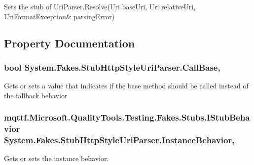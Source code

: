 Sets the stub of Uri\-Parser.\-Resolve(Uri base\-Uri, Uri relative\-Uri, Uri\-Format\-Exception\& parsing\-Error)



\subsection{Property Documentation}
\hypertarget{class_system_1_1_fakes_1_1_stub_http_style_uri_parser_a24a145543e9043e222e7a497476f4274}{
\subsubsection[{Call\-Base}]{\setlength{\rightskip}{0pt plus 5cm}bool System.\-Fakes.\-Stub\-Http\-Style\-Uri\-Parser.\-Call\-Base\hspace{0.3cm}{\ttfamily [get]}, {\ttfamily [set]}}}\label{class_system_1_1_fakes_1_1_stub_http_style_uri_parser_a24a145543e9043e222e7a497476f4274}


Gets or sets a value that indicates if the base method should be called instead of the fallback behavior

\hypertarget{class_system_1_1_fakes_1_1_stub_http_style_uri_parser_aa4947c1336e854be44b501f4b5b7add3}{
\subsubsection[{Instance\-Behavior}]{\setlength{\rightskip}{0pt plus 5cm}mqttf.\-Microsoft.\-Quality\-Tools.\-Testing.\-Fakes.\-Stubs.\-I\-Stub\-Behavior System.\-Fakes.\-Stub\-Http\-Style\-Uri\-Parser.\-Instance\-Behavior\hspace{0.3cm}{\ttfamily [get]}, {\ttfamily [set]}}}\label{class_system_1_1_fakes_1_1_stub_http_style_uri_parser_aa4947c1336e854be44b501f4b5b7add3}


Gets or sets the instance behavior.

